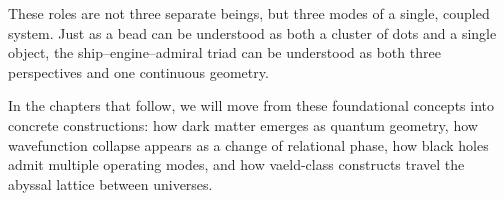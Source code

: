 These roles are not three separate beings, but three modes of a single,
coupled system. Just as a bead can be understood as both a cluster of dots and
a single object, the ship--engine--admiral triad can be understood as both
three perspectives and one continuous geometry.

In the chapters that follow, we will move from these foundational concepts
into concrete constructions: how dark matter emerges as quantum geometry, how
wavefunction collapse appears as a change of relational phase, how black holes
admit multiple operating modes, and how vaeld-class constructs travel the
abyssal lattice between universes.